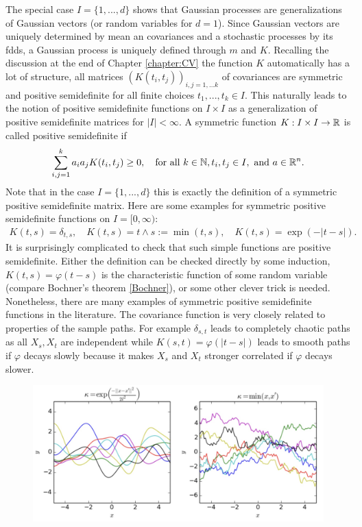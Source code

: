 The special case $I=\{1,...,d\}$ shows that Gaussian processes are generalizations of Gaussian vectors (or random variables for $d=1$). Since Gaussian vectors are uniquely determined by mean an covariances and a stochastic processes by its fdds, a Gaussian process is uniquely defined through $m$ and $K$. Recalling the discussion at the end of Chapter \ref{chapter:CV} the function $K$ automatically has a lot of structure, all matrices $(K(t_i,t_j))_{i,j=1,...k}$ of covariances are symmetric and positive semidefinite for all finite choices $t_1,...,t_k\in I$. This naturally leads to the notion of positive semidefinite functions on $I\times I$ as a generalization of positive semidefinite matrices for $|I|<\infty$. A symmetric function $K:I\times I\to \mathbb{R}$ is called positive semidefinite if 
\begin{align*}
	\sum_{i,j=1}^ka_ia_jK(t_i,t_j)\geq 0,\quad \text{for all }k\in\mathbb{N}, t_i, t_j\in I,\text{ and }a\in \mathbb{R}^n.
\end{align*}
 Note that in the case $I=\{1,...,d\}$ this is exactly the definition of a symmetric positive semidefinite matrix. Here are some examples for symmetric positive semidefinite functions on $I=[0,\infty)$:
\begin{align*}
	K(t,s)=\delta_{t,s},\quad K(t,s)=t\wedge s:=\min(t,s), \quad K(t,s)=\exp(-|t-s|).
\end{align*}
It is surprisingly complicated to check that such simple functions are positive semidefinite. Either the definition can be checked directly by some induction, $K(t,s)=\varphi(t-s)$ is the characteristic function of some random variable (compare Bochner's theorem \eqref{Bochner}), or some other clever trick is needed. Nonetheless, there are many examples of symmetric positive semidefinite functions in the literature. The covariance function is very closely related to properties of the sample paths. For example $\delta_{s,t}$ leads to completely chaotic paths as all $X_s, X_t$ are independent while $K(s,t)=\varphi(|t-s|)$ leads to smooth paths if $\varphi$ decays slowly because it makes $X_s$ and $X_t$ stronger correlated if $\varphi$ decays slower.
\begin{figure}[h]
	\begin{center}
		\includegraphics[scale=0.17]{Gaussian.jpeg}
	\end{center}
	\end{figure}
